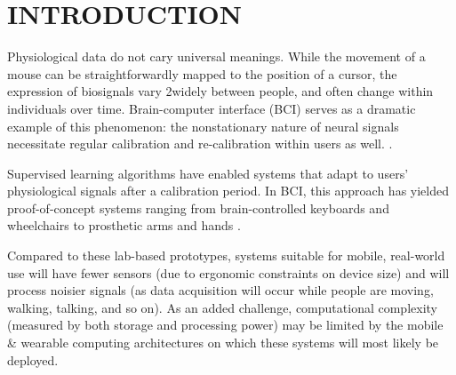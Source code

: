 \section{\uppercase{Introduction}}
\label{sec:introduction}

\noindent Physiological data do not cary universal meanings. While the movement of a mouse can be straightforwardly mapped to the position of a cursor, the expression of biosignals vary 2widely between people, and often change within individuals over time. Brain-computer interface (BCI) serves as a dramatic example of this phenomenon: the nonstationary nature of neural signals necessitate regular calibration and re-calibration within users as well. \cite{dornhege_toward_2007,mcfarland_brain-computer_2011}.

Supervised learning algorithms have enabled systems that adapt to users' physiological signals after a calibration period. In BCI, this approach has yielded proof-of-concept systems ranging from brain-controlled keyboards and wheelchairs to prosthetic arms and hands \cite{blankertz_note_2007,millan_combining_2010,d._mattia_brain_2011,hill_practical_2014,campbell_neurophone:_2010}. 




Compared to these lab-based prototypes, systems suitable for mobile, real-world use will have fewer sensors (due to ergonomic constraints on device size) and will process noisier signals (as data acquisition will occur while people are moving, walking, talking, and so on). As an added challenge, computational complexity (measured by both storage and processing power) may be limited by the mobile \& wearable computing architectures on which these systems will most likely be deployed. 


